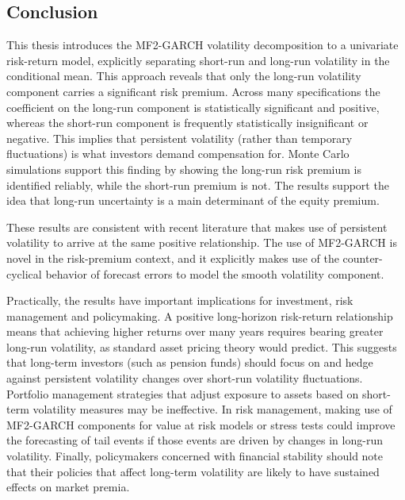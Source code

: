 \documentclass[12pt]{article}
\begin{document}
\subsection{Conclusion}
This thesis introduces the MF2-GARCH volatility decomposition to a univariate risk-return model, explicitly separating short-run and long-run volatility in the conditional mean. This approach reveals that only the long-run volatility component carries a significant risk premium. Across many specifications the coefficient on the long-run component is statistically significant and positive, whereas the short-run component is frequently statistically insignificant or negative. This implies that persistent volatility (rather than temporary fluctuations) is what investors demand compensation for. Monte Carlo simulations support this finding by showing the long-run risk premium is identified reliably, while the short-run premium is not. The results support the idea that long-run uncertainty is a main determinant of the equity premium.\par
These results are consistent with recent literature that makes use of persistent volatility to arrive at the same positive relationship. The use of MF2-GARCH is novel in the risk-premium context, and it explicitly makes use of the counter-cyclical behavior of forecast errors to model the smooth volatility component.\par
Practically, the results have important implications for investment, risk management and policymaking. A positive long-horizon risk-return relationship means that achieving higher returns over many years requires bearing greater long-run volatility, as standard asset pricing theory would predict. This suggests that long-term investors (such as pension funds) should focus on and hedge against persistent volatility changes over short-run volatility fluctuations. Portfolio management strategies that adjust exposure to assets based on short-term volatility measures may be ineffective. In risk management, making use of MF2-GARCH components for value at risk models or stress tests could improve the forecasting of tail events if those events are driven by changes in long-run volatility. Finally, policymakers concerned with financial stability should note that their policies that affect long-term volatility are likely to have sustained effects on market premia.\par
\end{document}
